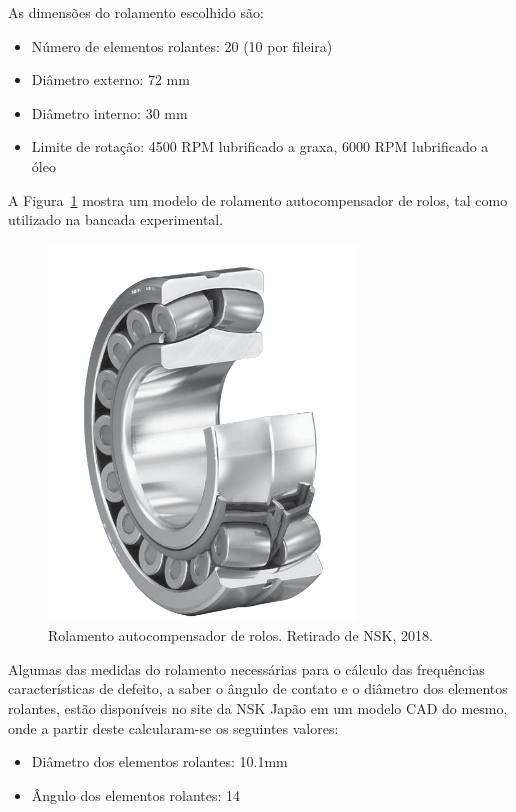 \documentclass[
	12pt,				
	oneside,			
	a4paper,			
	english,			
	brazil,			
	]{abntex2ppgsi}
\begin{document}
As dimensões do rolamento escolhido são:

\begin{itemize}
	\item Número de elementos rolantes: 20 (10 por fileira)
	\item Diâmetro externo: 72 \si{\mm}
	\item Diâmetro interno: 30 \si{\mm}
	\item Limite de rotação: 4500 RPM lubrificado a graxa, 6000 RPM lubrificado a óleo
\end{itemize}

A Figura~\ref{Figura24} mostra um modelo de rolamento autocompensador de rolos, tal como utilizado na bancada experimental.

\begin{figure}[H]
\centering
\includegraphics[width=\textwidth,height=100mm,keepaspectratio]{Figura24}
\caption {Rolamento autocompensador de rolos. Retirado de NSK, 2018.}
\label{Figura24}
\end{figure} 

Algumas das medidas do rolamento necessárias para o cálculo das frequências características de defeito, a saber o ângulo de contato e o diâmetro dos elementos rolantes, estão disponíveis no site da NSK Japão em um modelo CAD do mesmo, onde a partir deste calcularam-se os seguintes valores:

\begin{itemize}
	\item Diâmetro dos elementos rolantes: 10.1\si{\mm}
	\item Ângulo dos elementos rolantes: 14\textdegree
\end{itemize}
\end{document}
